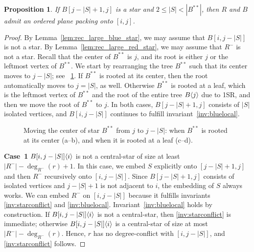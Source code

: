 \documentclass[11pt,a4paper,colorlinks=true,urlcolor=blue,citecolor=red]{article}
\theoremstyle{plain}
\newtheorem{proposition}[theorem]{Proposition}
\newcommand{\case}[1]{\par\vspace{.5\baselineskip}\noindent\textbf{\sffamily Case~#1}}
\begin{document}
\begin{proposition}\label{prop:rec_small_blue_star_larger}
  If $B[j-|S|+1,j]$ is a star and $2\leq |S|<|B^{**}|$, then $R$ and $B$
  admit an ordered plane packing onto $[i,j]$.
\end{proposition}
\begin{proof}
  By Lemma~\ref{lem:rec_large_blue_star}, we may assume that
  $B[i,j-|S|]$ is not a star. By Lemma~\ref{lem:rec_large_red_star}, we
  may assume that $R^-$ is not a star. Recall that the center of
  $B^{**}$ is $j$, and its root is either $j$ or the leftmost vertex of
  $B^{**}$. We start by rearranging the tree $B^{**}$ such that its
  center moves to $j-|S|$; see \figurename~\ref{fig:move_center}. If
  $B^{**}$ is rooted at its center, then the root automatically moves to
  $j=|S|$, as well. Otherwise $B^{**}$ is rooted at a leaf, which is the
  leftmost vertex of $B^{**}$ and the root of the entire tree
  $B\langle{j}\rangle$ due to 1SR, and then we move the root of $B^{**}$ to $j$.
  In both cases, $B[j-|S|+1,j]$ consists of $|S|$ isolated vertices, and
  $B[i,j-|S|]$ continues to fulfill invariant~\ref{inv:bluelocal}.

\begin{figure}
  \centering\hfil {}\hfil {}\hfil {}\hfil {}\hfil \caption{Moving the center of star $B^{**}$ from $j$ to $j-|S|$:
  when $B^{**}$ is rooted at its center (a--b), and when it is rooted at a leaf (c--d).
  \label{fig:move_center}
}
\end{figure}

\case{1} $B{[i,j-|S|]}\langle{i}\rangle$ is not a central-star of size at least
$|R^-|-\deg_{R^-}(r)+1$. In this case, we embed $S$ explicitly onto
$[j-|S|+1,j]$ and then $R^-$ recursively onto $[i,j-|S|]$. Since
$B[j-|S|+1,j]$ consists of isolated vertices and $j-|S|+1$ is not
adjacent to $i$, the embedding of $S$ always works. We can embed $R^-$
on $[i,j-|S|]$ because it fulfills invariants \ref{inv:starconflict} and
\ref{inv:bluelocal}. Invariant~\ref{inv:bluelocal} holds by
construction. If $B{[i,j-|S|]}\langle{i}\rangle$ is not a central-star, then
\ref{inv:starconflict} is immediate; otherwise $B{[i,j-|S|]}\langle{i}\rangle$
is a central-star of size at most $|R^-|-\deg_{R^-}(r)$. Hence, $r$ has
no degree-conflict with $[i,j-|S|]$, and \ref{inv:starconflict} follows.


\end{proof}
\end{document}
